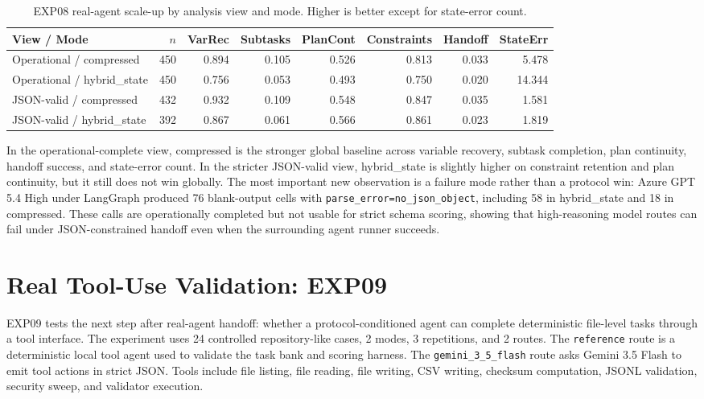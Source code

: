 \documentclass[11pt]{article}
\begin{document}
\begin{table}[ht]
\centering
\small
\begin{tabular}{lrrrrrrr}
\toprule
View / Mode & $n$ & VarRec & Subtasks & PlanCont & Constraints & Handoff & StateErr \\
\midrule
Operational / compressed & 450 & 0.894 & 0.105 & 0.526 & 0.813 & 0.033 & 5.478 \\
Operational / hybrid\_state & 450 & 0.756 & 0.053 & 0.493 & 0.750 & 0.020 & 14.344 \\
JSON-valid / compressed & 432 & 0.932 & 0.109 & 0.548 & 0.847 & 0.035 & 1.581 \\
JSON-valid / hybrid\_state & 392 & 0.867 & 0.061 & 0.566 & 0.861 & 0.023 & 1.819 \\
\bottomrule
\end{tabular}
\caption{EXP08 real-agent scale-up by analysis view and mode. Higher is better except for state-error count.}
\label{tab:exp08_modes}
\end{table}

In the operational-complete view, compressed is the stronger global baseline across variable recovery, subtask completion, plan continuity, handoff success, and state-error count. In the stricter JSON-valid view, hybrid\_state is slightly higher on constraint retention and plan continuity, but it still does not win globally. The most important new observation is a failure mode rather than a protocol win: Azure GPT 5.4 High under LangGraph produced 76 blank-output cells with \texttt{parse\_error=no\_json\_object}, including 58 in hybrid\_state and 18 in compressed. These calls are operationally completed but not usable for strict schema scoring, showing that high-reasoning model routes can fail under JSON-constrained handoff even when the surrounding agent runner succeeds.

\section{Real Tool-Use Validation: EXP09}
EXP09 tests the next step after real-agent handoff: whether a protocol-conditioned agent can complete deterministic file-level tasks through a tool interface. The experiment uses 24 controlled repository-like cases, 2 modes, 3 repetitions, and 2 routes. The \texttt{reference} route is a deterministic local tool agent used to validate the task bank and scoring harness. The \texttt{gemini\_3\_5\_flash} route asks Gemini 3.5 Flash to emit tool actions in strict JSON. Tools include file listing, file reading, file writing, CSV writing, checksum computation, JSONL validation, security sweep, and validator execution.
\end{document}
